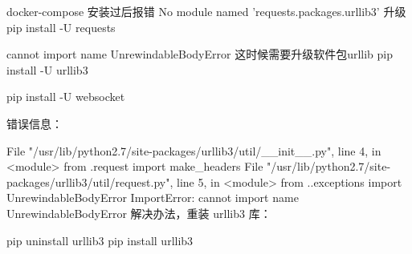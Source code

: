 
docker-compose 安装过后报错
 No module named 'requests.packages.urllib3'
升级 pip install -U requests

cannot import name UnrewindableBodyError
这时候需要升级软件包urllib
pip install -U urllib3

pip install -U websocket


错误信息：

File "/usr/lib/python2.7/site-packages/urllib3/util/__init__.py", line 4, in <module>
    from .request import make_headers
  File "/usr/lib/python2.7/site-packages/urllib3/util/request.py", line 5, in <module>
    from ..exceptions import UnrewindableBodyError
ImportError: cannot import name UnrewindableBodyError
解决办法，重装 urllib3 库：

pip uninstall urllib3
pip install urllib3
